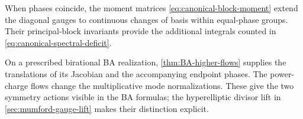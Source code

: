When phases coincide, the moment matrices
\cref{eq:canonical-block-moment} extend the diagonal gauges to
continuous changes of basis within equal-phase groups.
Their principal-block invariants provide the additional integrals
counted in \cref{eq:canonical-spectral-deficit}.

On a prescribed birational BA realization,
\cref{thm:BA-higher-flows} supplies the translations of its Jacobian
and the accompanying endpoint phases. The power-charge flows change
the multiplicative mode normalizations. These give the two symmetry
actions visible in the BA formulas; the hyperelliptic divisor lift in
\cref{sec:mumford-gauge-lift} makes their distinction explicit.
